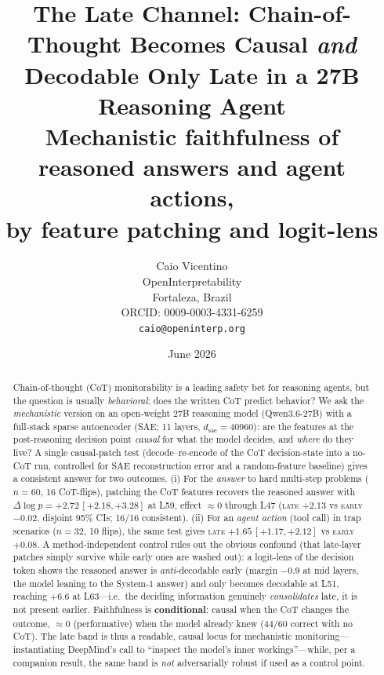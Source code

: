 \documentclass[11pt]{article}
\title{The Late Channel: Chain-of-Thought Becomes Causal \emph{and}\\
Decodable Only Late in a 27B Reasoning Agent\\[2pt]
\large Mechanistic faithfulness of reasoned answers and agent actions,\\ by feature patching and logit-lens}
\author{%
  Caio Vicentino \\ OpenInterpretability \\ Fortaleza, Brazil \\
  ORCID: 0009-0003-4331-6259 \\ \texttt{caio@openinterp.org}}
\date{June 2026}
\begin{document}
\maketitle

\begin{abstract}
Chain-of-thought (CoT) monitorability is a leading safety bet for reasoning agents, but the question is
usually \emph{behavioral}: does the written CoT predict behavior? We ask the \emph{mechanistic} version on an
open-weight 27B reasoning model (Qwen3.6-27B) with a full-stack sparse autoencoder (SAE; 11 layers,
$d_{\text{sae}}{=}40960$): are the features at the post-reasoning decision point \emph{causal} for what the
model decides, and \emph{where} do they live? A single causal-patch test (decode--re-encode of the CoT
decision-state into a no-CoT run, controlled for SAE reconstruction error and a random-feature baseline) gives
a consistent answer for two outcomes. (i) For the \emph{answer} to hard multi-step problems ($n{=}60$, 16
CoT-flips), patching the CoT features recovers the reasoned answer with $\Delta\log p = +2.72\,[+2.18,+3.28]$
at L59, effect $\approx 0$ through L47 (\textsc{late} $+2.13$ vs \textsc{early} $-0.02$, disjoint 95\% CIs;
16/16 consistent). (ii) For an \emph{agent action} (tool call) in trap scenarios ($n{=}32$, 10 flips), the
same test gives \textsc{late} $+1.65\,[+1.17,+2.12]$ vs \textsc{early} $+0.08$. A method-independent control
rules out the obvious confound (that late-layer patches simply survive while early ones are washed out): a
logit-lens of the decision token shows the reasoned answer is \emph{anti}-decodable early (margin
$-0.9$ at mid layers, the model leaning to the System-1 answer) and only becomes decodable at L51, reaching
$+6.6$ at L63---i.e.\ the deciding information genuinely \emph{consolidates} late, it is not present earlier.
Faithfulness is \textbf{conditional}: causal when the CoT changes the outcome, $\approx 0$ (performative) when
the model already knew (44/60 correct with no CoT). The late band is thus a readable, causal locus for
mechanistic monitoring---instantiating DeepMind's call to ``inspect the model's inner workings''---while, per
a companion result, the same band is \emph{not} adversarially robust if used as a control point.
\end{abstract}
\end{document}
